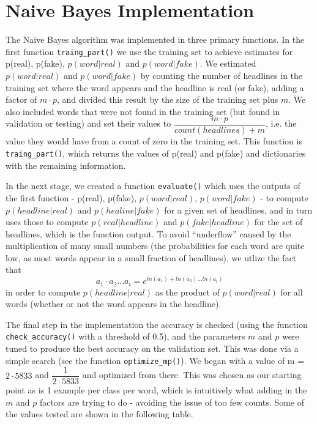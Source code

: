 \documentclass{article}
\begin{document}
   \section{Naive Bayes Implementation}
   The Naive Bayes algorithm was implemented in three primary functions.
   In the first function \texttt{traing\_part()} we use the training set to achieve estimates for p(real),
   p(fake), $p(word | real)$ and $p(word | fake)$. We estimated $ p(word | real)$ and $p(word | fake)$ by counting
   the number of headlines in the training set where the word appears and the headline is real (or fake), adding a
   factor of $ m \cdot p$, and divided this result by the size of the training set plus $m$. We also included
   words that were not found in the training set (but found in validation or testing) and set their
   values to $ \dfrac {m \cdot p}{count(headlines) + m}$, i.e. the value they would have from a count of zero in
   the training set. This function is \texttt{traing\_part()}, which returns the values of p(real) and p(fake)
   and dictionaries with the remaining information.

   In the next stage, we created a function \texttt{evaluate()} which uses the outputs of the first
   function -  p(real), p(fake), $p(word | real)$, $p(word | fake)$ - to
   compute $p(headline | real)$ and $p(healine | fake)$ for a given set of headlines, and in turn uses
   those to compute $p(real | headline)$ and $p(fake | headline)$ for the set of headlines, which is
   the function output. To avoid ``underflow'' caused by the multiplication of many small numbers (the
   probabilities for each word are quite low, as most words appear in a small fraction of headlines),
   we utlize the fact that
      \begin{equation*}
         a_1 \cdot a_2 ... a_i =  e^{ln(a_1) + ln(a_2) ... ln(a_i)}
      \end{equation*}
   in order to compute $p(headline|real)$ as the product of $p(word|real)$ for all words (whether or not
   the word appears in the headline).

   The final step in the implementation the accuracy is checked (using the function \texttt{check\_accuracy()}
   with a threshold of 0.5), and the parameters $m$ and $p$ were tuned to produce the best accuracy on
   the validation set. This was done via a simple search (see the function \texttt{optimize\_mp()}).
   We began with a value of m = $2 \cdot 5833 $ and $ \dfrac {1}{2 \cdot 5833}$ and optimized from there.
   This was chosen as our starting point as is 1 example per class per word, which is intuitively what adding in
   the $m$ and $p$ factors are trying to do - avoiding the issue of too few counts.
   Some of the values tested are shown in the following table.
\end{document}
